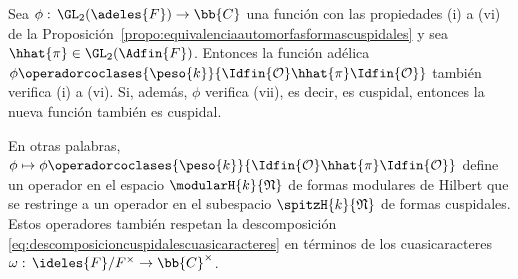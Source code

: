 \begin{propoCoclaseDoblePreservaElEspacioDeFormasCuspidales}
	\label{propo:coclasedoblepreservaelespaciodeformascuspidales}
	Sea $\phi:\,\GL_{2}(\adeles{F})\rightarrow\bb{C}$ una funci\'{o}n
	con las propiedades (i) a (vi) de la
	Proposici\'{o}n~\ref{propo:equivalenciaautomorfasformascuspidales} y
	sea $\hhat{\pi}\in\GL_{2}(\Adfin{F})$. Entonces la funci\'{o}n
	ad\'{e}lica
	\begin{math}
		\phi\operadorcoclases{\peso{k}}{%
			\Idfin{\cal{O}}\hhat{\pi}\Idfin{\cal{O}}}
	\end{math}
	tambi\'{e}n verifica (i) a (vi). Si, adem\'{a}s, $\phi$ verifica
	(vii), es decir, es cuspidal, entonces la nueva funci\'{o}n tambi\'{e}n
	es cuspidal.
\end{propoCoclaseDoblePreservaElEspacioDeFormasCuspidales}

En otras palabras,
\begin{math}
	\phi\mapsto\phi\operadorcoclases{\peso{k}}{%
		\Idfin{\cal{O}}\hhat{\pi}\Idfin{\cal{O}}}
\end{math}
define un operador en el espacio $\modularH{k}{\frak{N}}$ de formas modulares
de Hilbert que se restringe a un operador en el subespacio
$\spitzH{k}{\frak{N}}$ de formas cuspidales. Estos operadores tambi\'{e}n
respetan la descomposici\'{o}n
\eqref{eq:descomposicioncuspidalescuasicaracteres} en t\'{e}rminos de los
cuasicaracteres $\omega:\,\ideles{F}/F^{\times}\rightarrow\bb{C}^{\times}$.

